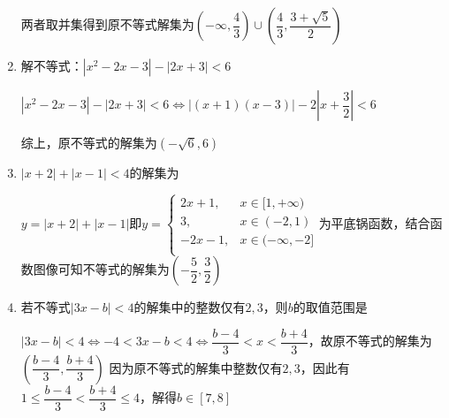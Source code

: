 \begin{enumerate}
\begin{jieda}
        两者取并集得到原不等式解集为$\left(-\infty, \dfrac{4}{3}\right) \cup \left(\dfrac{4}{3}, \dfrac{3+\sqrt{5}}{2}\right)$
    \end{jieda}
    \item 解不等式：$|x^2-2x-3|-|2x+3| < 6$
    \begin{jieda}
        $|x^2-2x-3|-|2x+3| < 6  \Longleftrightarrow |(x+1)(x-3)|-2\left|x+\dfrac{3}{2}\right| < 6$
        \begin{dingautolist}{172}
            \item $x \in \left[-\dfrac{3}{2}, -1\right) \cup [3, +\infty)$，原不等式即$(x^2-2x-3)-(2x+3) < 6$，即$x^2-4x-12 < 0$，解得$x \in \left[-\dfrac{3}{2}, -1\right) \cup [3, 6)$
            \item $x \in [-1, 3)$原不等式即$-(x^2-2x-3)-(2x+3) < 6$，即$-x^2 < 6$，解得$x \in [-1, 3)$
            \item $x \in \left(-\infty, -\dfrac{3}{2}\right)$，原不等式即$(x^2-2x-3)+(2x+3) < 6$，即$x^2 < 6$，解得$x \in \left(-\sqrt{6}, -\dfrac{3}{2}\right)$
        \end{dingautolist}
        综上，原不等式的解集为$(-\sqrt{6}, 6)$
    \end{jieda}
    \item $|x+2| + |x-1| < 4$的解集为
    \begin{jieda}
        $y = |x+2| + |x-1|$即$y = \left \{ \begin{array}{ll}
             2x+1, & x \in [1, +\infty) \\
             3, & x \in (-2, 1) \\
             -2x-1, & x \in (-\infty, -2]\\
        \end{array} \right.$为平底锅函数，结合函数图像可知不等式的解集为$\left(-\dfrac{5}{2}, \dfrac{3}{2}\right)$
    \end{jieda}
    \item 若不等式$|3x-b| < 4$的解集中的整数仅有$2, 3$，则$b$的取值范围是\blkda{$[7, 8]$}
    \begin{jieda}
        $|3x-b| < 4 \Longleftrightarrow -4 < 3x-b < 4 \Longleftrightarrow \dfrac{b-4}{3} < x < \dfrac{b+4}{3}$，故原不等式的解集为$\left(\dfrac{b-4}{3}, \dfrac{b+4}{3}\right)$ 因为原不等式的解集中整数仅有$2, 3$，因此有$1 \leq \dfrac{b-4}{3} < \dfrac{b+4}{3} \leq 4$，解得$b \in [7, 8]$
    \end{jieda}
\end{enumerate}

